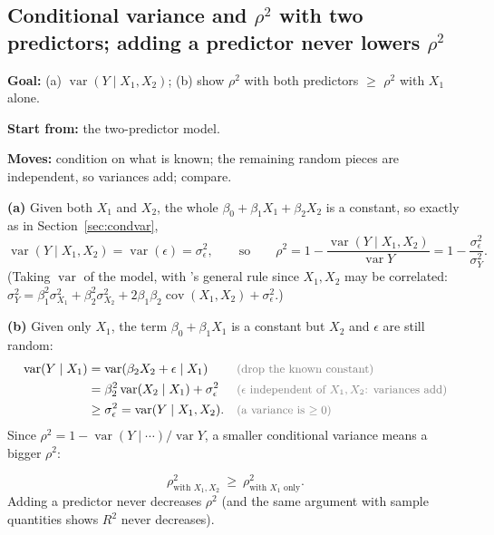\documentclass[11pt]{article}
\newcommand{\Var}{\operatorname{var}}
\newcommand{\Cov}{\operatorname{cov}}
\newcommand{\given}{\mid}
\newcommand{\why}[1]{&&\text{\small\color{gray}(#1)}}
\newcommand{\mv}[1]{\tcbox[on line, colback=methodclr, colframe=methodclr, coltext=white, boxsep=0pt,
  left=2pt, right=2pt, top=1pt, bottom=1pt, arc=1.5pt]{\sffamily\scriptsize\bfseries M#1}}
\newcommand{\goal}[1]{\textbf{Goal:} #1\par}
\newcommand{\start}[1]{\textbf{Start from:} #1\par}
\newcommand{\moves}[1]{\textbf{Moves:} #1\par}
\begin{document}
\subsection{Conditional variance and $\rho^2$ with two predictors; adding a predictor never lowers $\rho^2$}\label{sec:two-var}
\begin{methodbox}
\goal{(a) $\Var(Y\given X_1,X_2)$; (b) show $\rho^2$ with both predictors $\ge$ $\rho^2$ with $X_1$ alone.}
\start{the two-predictor model.}
\moves{\mv{5} condition on what is known; \mv{4} the remaining random pieces are independent, so variances add; compare.}
\end{methodbox}
\textbf{(a)} Given both $X_1$ and $X_2$, the whole $\beta_0+\beta_1X_1+\beta_2X_2$ is a constant, so exactly as in Section~\ref{sec:condvar},
\[
\Var(Y\given X_1,X_2)=\Var(\epsilon)=\sigma_\epsilon^2,\qquad\text{so}\qquad \rho^2=1-\frac{\Var(Y\given X_1,X_2)}{\Var Y}=1-\frac{\sigma_\epsilon^2}{\sigma_Y^2}.
\]
(Taking $\Var$ of the model, with \mv{4}'s general rule since $X_1,X_2$ may be correlated:
$\sigma_Y^2=\beta_1^2\sigma_{X_1}^2+\beta_2^2\sigma_{X_2}^2+2\beta_1\beta_2\Cov(X_1,X_2)+\sigma_\epsilon^2$.)

\textbf{(b)} Given only $X_1$, the term $\beta_0+\beta_1X_1$ is a constant but $X_2$ and $\epsilon$ are still random:
\begin{align*}
\Var(Y\given X_1)&=\Var(\beta_2X_2+\epsilon\given X_1) \why{drop the known constant}\\
&=\beta_2^2\Var(X_2\given X_1)+\sigma_\epsilon^2 \why{$\epsilon$ independent of $X_1,X_2$: variances add}\\
&\ge\sigma_\epsilon^2=\Var(Y\given X_1,X_2). \why{a variance is $\ge0$}
\end{align*}
Since $\rho^2=1-\Var(Y\given\cdots)/\Var Y$, a smaller conditional variance means a bigger $\rho^2$:
\begin{keybox}
\[\rho^2_{\text{with }X_1,X_2}\ \ge\ \rho^2_{\text{with }X_1\text{ only}}.\]
Adding a predictor never decreases $\rho^2$ (and the same argument with sample quantities shows $R^2$ never decreases).
\end{keybox}
\end{document}

